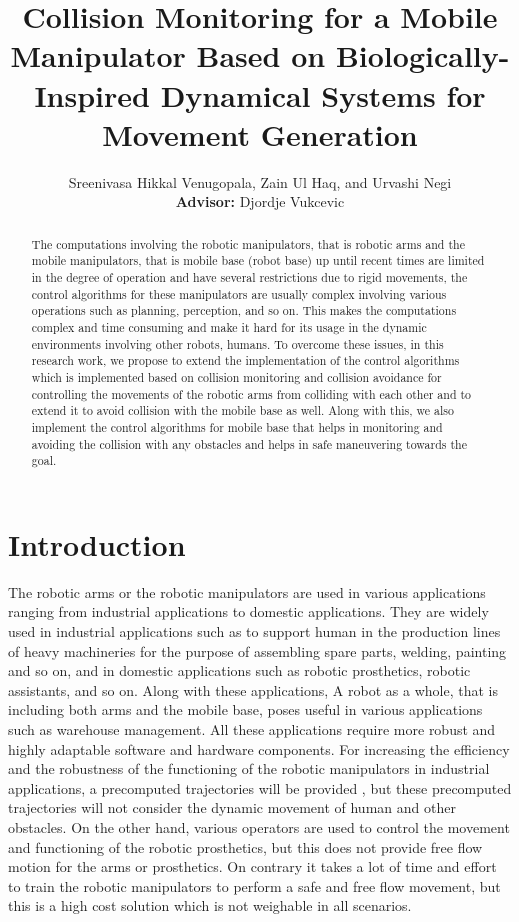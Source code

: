 \documentclass[a4paper, 11.5pt, conference]{ieeeconf}      %
\title{\LARGE \bf Collision Monitoring for a Mobile Manipulator Based on Biologically-Inspired Dynamical Systems for Movement Generation}
\author{Sreenivasa Hikkal Venugopala, Zain Ul Haq, and Urvashi Negi \\ {\small \textbf{Advisor:} Djordje Vukcevic}}
\begin{document}
\maketitle
\thispagestyle{empty}
\pagestyle{empty}


\begin{abstract}
The computations involving the robotic manipulators, that is robotic arms and the mobile manipulators, that is mobile base (robot base) up until recent times are limited in the degree of operation and have several restrictions due to rigid movements, the control algorithms for these manipulators are usually complex involving various operations such as planning, perception, and so on. This makes the computations complex and time consuming and make it hard for its usage in the dynamic environments involving other robots, humans. To overcome these issues, in this research work, we propose to extend the implementation of the control algorithms which is implemented based on collision monitoring \cite{Khatib} and collision avoidance \cite{Hoffmann} for controlling the movements of the robotic arms from colliding with each other and to extend it to avoid collision with the mobile base as well. Along with this, we also implement the control algorithms for mobile base that helps in monitoring and avoiding the collision with any obstacles and helps in safe maneuvering towards the goal.

\end{abstract}


\section{Introduction} 

The robotic arms or the robotic manipulators are used in various applications ranging from industrial applications to domestic applications. They are widely used in industrial applications such as to support human in the production lines of heavy machineries for the purpose of assembling spare parts, welding, painting and so on, and in domestic applications such as robotic prosthetics, robotic assistants, and so on. Along with these applications, A robot as a whole, that is including both arms and the mobile base, poses useful in various applications such as warehouse management. All these applications require more robust and highly adaptable software and hardware components. For increasing the efficiency and the robustness of the functioning of the robotic manipulators in industrial applications, a precomputed trajectories will be provided \cite{Hoffmann}, but these precomputed trajectories will not consider the dynamic movement of human and other obstacles. On the other hand, various operators are used to control the movement and functioning of the robotic prosthetics, but this does not provide free flow motion for the arms or prosthetics. On contrary it takes a lot of time and effort to train the robotic manipulators to perform a safe and free flow movement, but this is a high cost solution which is not weighable in all scenarios.
\end{document}
